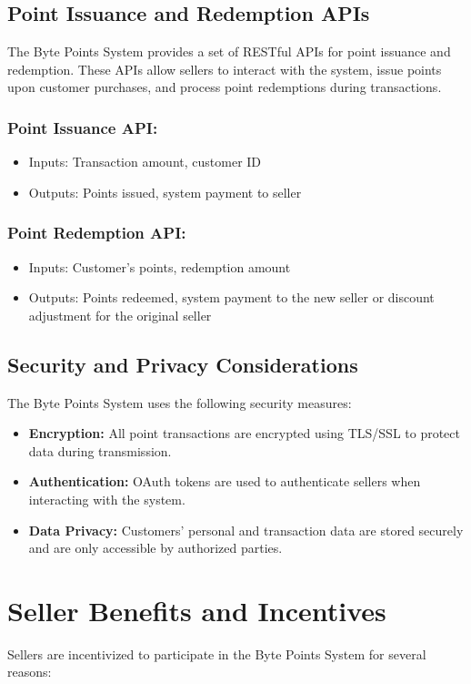\documentclass[a4paper,12pt]{article}
\begin{document}
\subsection{Point Issuance and Redemption APIs}
The Byte Points System provides a set of RESTful APIs for point issuance and redemption. These APIs allow sellers to interact with the system, issue points upon customer purchases, and process point redemptions during transactions.

\subsubsection{Point Issuance API:}
\begin{itemize}
    \item Inputs: Transaction amount, customer ID
    \item Outputs: Points issued, system payment to seller
\end{itemize}

\subsubsection{Point Redemption API:}
\begin{itemize}
    \item Inputs: Customer's points, redemption amount
    \item Outputs: Points redeemed, system payment to the new seller or discount adjustment for the original seller
\end{itemize}

\subsection{Security and Privacy Considerations}
The Byte Points System uses the following security measures:
\begin{itemize}
    \item \textbf{Encryption:} All point transactions are encrypted using TLS/SSL to protect data during transmission.
    \item \textbf{Authentication:} OAuth tokens are used to authenticate sellers when interacting with the system.
    \item \textbf{Data Privacy:} Customers’ personal and transaction data are stored securely and are only accessible by authorized parties.
\end{itemize}

\section{Seller Benefits and Incentives}
Sellers are incentivized to participate in the Byte Points System for several reasons:
\end{document}
